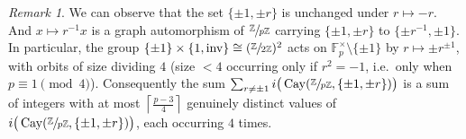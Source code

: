 \documentclass{article}
\theoremstyle{plain}
\newtheorem{theorem}{Theorem}[section]
\theoremstyle{definition}
\theoremstyle{remark}
\newtheorem{remark}[theorem]{Remark}
\newcommand{\Z}{\mathbb{Z}}
\newcommand{\F}{\mathbb{F}}
\newcommand{\quot}[2]{\sfrac{#1}{#2}}
\DeclareMathOperator{\Cay}{Cay}
\DeclareMathOperator{\orb}{orb}
\begin{document}

\begin{remark}
    We can observe that the set $\{\pm1,\pm r\}$ is unchanged under $r\mapsto-r$. And $x\mapsto r^{-1}x$ is a graph automorphism of $\quot{\Z}{p\Z}$ carrying $\{\pm1,\pm r\}$ to $\{\pm r^{-1},\pm1\}$. In particular, the group $\{\pm1\}\times\{1,\mathrm{inv}\}\cong(\sfrac{\Z}{2\Z})^2$ acts on $\F_p^\times\setminus\{\pm1\}$ by $r\mapsto\pm r^{\pm1}$, with orbits of size dividing $4$ (size $<4$ occurring only if $r^2=-1$, i.e.\ only when $p\equiv1\pmod4$). Consequently the sum $\sum_{r\ne\pm1} i\big(\Cay(\sfrac{\Z}{p\Z},\{\pm1,\pm r\})\big)$ is a sum of integers with at most $\left\lceil\frac{p-3}{4}\right\rceil$ genuinely distinct values of $i\big(\Cay(\sfrac{\Z}{p\Z},\{\pm1,\pm r\})\big)$, each occurring  $4$ times.
\end{remark}
\end{document}
